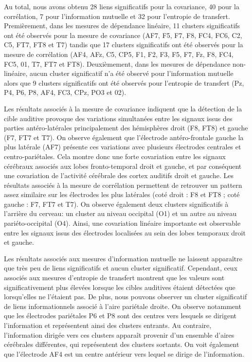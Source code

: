 Au total, nous avons obtenu 28 liens significatifs pour la covariance, 40 pour la corrélation, 7 pour l'information mutuelle et 32 pour l'entropie de transfert. 
Premièrement, dans les mesures de dépendance linéaire, 11 clusters significatifs ont été observés pour la mesure de covariance (AF7, F5, F7, F8, FC4, FC6, C2, C5, FT7, FT8 et T7) tandis que 17 clusters significatifs ont été observés pour la mesure de corrélation (AF4, AFz, C5, CP5, F1, F2, F3, F5, F7, Fz, F8, FC4, FC5, 01, T7, FT7 et FT8). 
Deuxièmement, dans les mesures de dépendance non-linéaire, aucun cluster significatif n'a été observé pour l'information mutuelle alors que 9 clusters significatifs ont été observés pour l'entropie de transfert (Pz, P4, P6, P8, AF4, FC3, CPz, PO3 et 02). 

Les résultats associés à la mesure de covariance indiquent que la détection de la cible auditive provoque des variations simultanées entre les signaux issus des parties antéro-latérales principalement des hémisphères droit (F8, FT8) et gauche (F7, FT7 et T7). 
On observe également que l'électrode antéro-frontale gauche la plus latérale (AF7) présente ces variations avec plusieurs électrodes centrales et centro-pariétales. 
Cela montre donc une forte covariation entre les signaux cérébraux associés aux lobes fronto-temporal droit et gauche, et par conséquent une covariation de l'activité cérébrale des cortex auditifs droit et gauche. 
Les résultats associés à la mesure de corrélation permettent de retrouver un pattern assez similaire sur les électrodes les plus latérales (coté droit : F8 et FT8 ; coté gauche : F7, FT7 et T7). 
On observe également deux clusters significatifs à l'arrière du cerveau: un cluster au niveau occipital (O1) et un autre au niveau pariéto-occipital (O4).
Ainsi, une covariation linéaire importante est observable entre les signaux issus des électrodes localisées au sein des lobes temporaux droit et gauche. 

Les résultats associés aux mesures d'information mutuelle ne laissent apparaître que très peu de liens significatifs et aucun cluster significatif. 
Cependant, ceux associés aux mesures d'entropie de transfert montrent que les valeurs sont significativement plus élevées lorsque les cibles auditives étaient détectées que lorsqu'elles ne l'étaient pas. 
De plus, nous pouvons observer un cluster significatif de liens informationnels associé à l'aire pariétale droite. 
On observe notamment que les électrodes pariétales P6 et P8 sont des centres vers lesquels se dirigent l'information et représentent ainsi des clusters entrants. 
Au contraire, l'information dirigée vers ces clusters apparaît provenir d'un ensemble d'aires cérébrales différentes, qui représentent des clusters sortants. 
On voit également que l'électrode AF4 est un centre antérieur vers lequel se dirige de l'information. 

